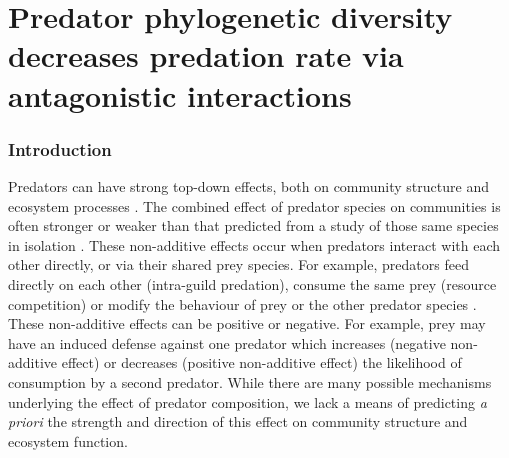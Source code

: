 \chapter{Predator phylogenetic diversity decreases predation rate via antagonistic interactions}
\label{chap:pd-ef}

\subsection{Introduction}\label{introduction}

Predators can have strong top-down effects, both on community structure
and ecosystem processes \citep{Estes2011}. The combined effect of
predator species on communities is often stronger or weaker than that
predicted from a study of those same species in isolation
\citep{Sih1998a, Ives2005}. These non-additive effects occur when
predators interact with each other directly, or via their shared prey
species. For example, predators feed directly on each other (intra-guild
predation), consume the same prey (resource competition) or modify the
behaviour of prey or the other predator species
\citep{Sih1998a, Griswold2006, Nystrom2001}. These non-additive effects
can be positive or negative. For example, prey may have an induced
defense against one predator which increases (negative non-additive
effect) or decreases (positive non-additive effect) the likelihood of
consumption by a second predator. While there are many possible
mechanisms underlying the effect of predator composition, we lack a
means of predicting \emph{a priori} the strength and direction of this
effect on community structure and ecosystem function.

